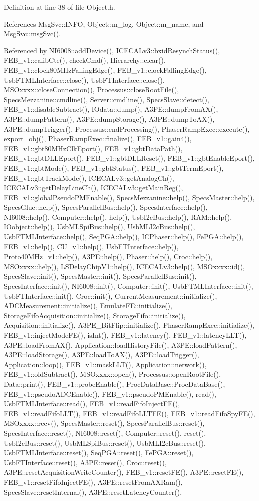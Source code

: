 Definition at line 38 of file Object.h.

References MsgSvc::INFO, Object::m\_\-log, Object::m\_\-name, and MsgSvc::msgSvc().

Referenced by NI6008::addDevice(), ICECALv3::bxidResynchStatus(), FEB\_\-v1::calibCte(), checkCmd(), Hierarchy::clear(), FEB\_\-v1::clock80MHzFallingEdge(), FEB\_\-v1::clockFallingEdge(), UsbFTMLInterface::close(), UsbFTInterface::close(), MSOxxxx::closeConnection(), Processus::closeRootFile(), SpecsMezzanine::cmdline(), Server::cmdline(), SpecsSlave::detect(), FEB\_\-v1::disableSubtract(), IOdata::dump(), A3PE::dumpFromAX(), A3PE::dumpPattern(), A3PE::dumpStorage(), A3PE::dumpToAX(), A3PE::dumpTrigger(), Processus::endProcessing(), PhaserRampExec::execute(), export\_\-obj(), PhaserRampExec::finalize(), FEB\_\-v1::gain4(), FEB\_\-v1::gbt80MHzClkEport(), FEB\_\-v1::gbtDataPath(), FEB\_\-v1::gbtDLLEport(), FEB\_\-v1::gbtDLLReset(), FEB\_\-v1::gbtEnableEport(), FEB\_\-v1::gbtMode(), FEB\_\-v1::gbtStatus(), FEB\_\-v1::gbtTermEport(), FEB\_\-v1::gbtTrackMode(), ICECALv3::getAnalogCh(), ICECALv3::getDelayLineCh(), ICECALv3::getMainReg(), FEB\_\-v1::globalPseudoPMEnable(), SpecsMezzanine::help(), SpecsMaster::help(), SpecsGlue::help(), SpecsParallelBus::help(), SpecsInterface::help(), NI6008::help(), Computer::help(), help(), UsbI2cBus::help(), RAM::help(), IOobject::help(), UsbMLSpiBus::help(), UsbMLI2cBus::help(), UsbFTMLInterface::help(), SeqPGA::help(), ICPhaser::help(), FePGA::help(), FEB\_\-v1::help(), CU\_\-v1::help(), UsbFTInterface::help(), Proto40MHz\_\-v1::help(), A3PE::help(), Phaser::help(), Croc::help(), MSOxxxx::help(), LSDelayChipV1::help(), ICECALv3::help(), MSOxxxx::id(), SpecsSlave::init(), SpecsMaster::init(), SpecsParallelBus::init(), SpecsInterface::init(), NI6008::init(), Computer::init(), UsbFTMLInterface::init(), UsbFTInterface::init(), Croc::init(), CurrentMeasurement::initialize(), ADCMeasurement::initialize(), EmulateFE::initialize(), StorageFifoAcquisition::initialize(), StorageFifo::initialize(), Acquisition::initialize(), A3PE\_\-BitFlip::initialize(), PhaserRampExec::initialize(), FEB\_\-v1::injectModeFE(), isInt(), FEB\_\-v1::latency(), FEB\_\-v1::latencyLLT(), A3PE::loadFromAX(), Application::loadHistoryFile(), A3PE::loadPattern(), A3PE::loadStorage(), A3PE::loadToAX(), A3PE::loadTrigger(), Application::loop(), FEB\_\-v1::maskLLT(), Application::network(), FEB\_\-v1::oldSubtract(), MSOxxxx::open(), Processus::openRootFile(), Data::print(), FEB\_\-v1::probeEnable(), ProcDataBase::ProcDataBase(), FEB\_\-v1::pseudoADCEnable(), FEB\_\-v1::pseudoPMEnable(), read(), UsbFTMLInterface::read(), FEB\_\-v1::readFifoInjectFE(), FEB\_\-v1::readFifoLLT(), FEB\_\-v1::readFifoLLTFE(), FEB\_\-v1::readFifoSpyFE(), MSOxxxx::recv(), SpecsMaster::reset(), SpecsParallelBus::reset(), SpecsInterface::reset(), NI6008::reset(), Computer::reset(), reset(), UsbI2cBus::reset(), UsbMLSpiBus::reset(), UsbMLI2cBus::reset(), UsbFTMLInterface::reset(), SeqPGA::reset(), FePGA::reset(), UsbFTInterface::reset(), A3PE::reset(), Croc::reset(), A3PE::resetAcquisitionWriteCounter(), FEB\_\-v1::resetFE(), A3PE::resetFE(), FEB\_\-v1::resetFifoInjectFE(), A3PE::resetFromAXRam(), SpecsSlave::resetInternal(), A3PE::resetLatencyCounter(), 
